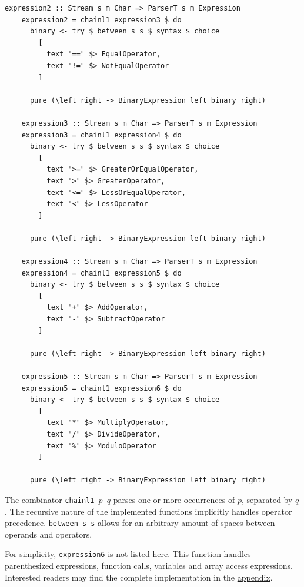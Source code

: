 \documentclass[UdineBachThesis,american,11pt]{PhdThesis}
\begin{document}
  \pagebreak

  \begin{Verbatim}[gobble=4,fontsize=\small]
    expression2 :: Stream s m Char => ParserT s m Expression
    expression2 = chainl1 expression3 $ do
      binary <- try $ between s s $ syntax $ choice
        [
          text "==" $> EqualOperator,
          text "!=" $> NotEqualOperator
        ]

      pure (\left right -> BinaryExpression left binary right)

    expression3 :: Stream s m Char => ParserT s m Expression
    expression3 = chainl1 expression4 $ do
      binary <- try $ between s s $ syntax $ choice
        [
          text ">=" $> GreaterOrEqualOperator,
          text ">" $> GreaterOperator,
          text "<=" $> LessOrEqualOperator,
          text "<" $> LessOperator
        ]

      pure (\left right -> BinaryExpression left binary right)

    expression4 :: Stream s m Char => ParserT s m Expression
    expression4 = chainl1 expression5 $ do
      binary <- try $ between s s $ syntax $ choice
        [
          text "+" $> AddOperator,
          text "-" $> SubtractOperator
        ]

      pure (\left right -> BinaryExpression left binary right)

    expression5 :: Stream s m Char => ParserT s m Expression
    expression5 = chainl1 expression6 $ do
      binary <- try $ between s s $ syntax $ choice
        [
          text "*" $> MultiplyOperator,
          text "/" $> DivideOperator,
          text "%" $> ModuloOperator
        ]

      pure (\left right -> BinaryExpression left binary right)
  \end{Verbatim}

  The combinator \mbox{\texttt{chainl1 $p$ $q$}} parses one or more occurrences
  of $p$, separated by $q$. The recursive nature of the implemented functions
  implicitly handles operator precedence. \mbox{\texttt{between s s}} allows for
  an arbitrary amount of spaces between operands and operators.

  For simplicity, \mbox{\texttt{expression6}} is not listed here. This function
  handles parenthesized expressions, function calls, variables and array access
  expressions. Interested readers may find the complete implementation in the
  \hyperref[chapter:devin-source-code]{appendix}.

  \newpage
\end{document}
